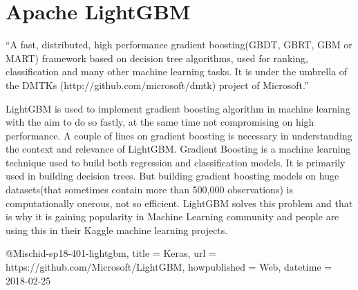 \section{Apache LightGBM} 

“A fast, distributed, high performance gradient boosting(GBDT, GBRT, GBM or
MART) framework based on decision tree algorithms, used for ranking,
classification and many other machine learning tasks. It is under the umbrella
of the DMTKs (http://github.com/microsoft/dmtk) project of Microsoft.”~\cite{hid-
sp18-401-lightgbm} 

LightGBM is used to implement gradient boosting algorithm in
machine learning with the aim to do so fastly, at the same time not compromising
on high performance.  A couple of lines on gradient boosting is necessary in
understanding the context and relevance of LightGBM. Gradient Boosting is a
machine learning technique used to build both regression and classification
models. It is primarily used in building decision trees. But building gradient
boosting models on huge datasets(that sometimes contain more than 500,000
observations) is computationally onerous, not so efficient.  LightGBM solves
this problem and that is why it is gaining popularity in Machine Learning
community and people are using this in their Kaggle machine learning projects.

@Misc{hid-sp18-401-lightgbm, 
title = {Keras}, 
url = {https://github.com/Microsoft/LightGBM}, 
howpublished = {Web}, 
datetime = {2018-02-25} }


